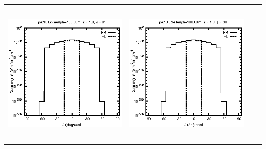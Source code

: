\documentclass[10pt,a4paper]{article}
\begin{document}
\begin{adjustwidth}{-1.2in}{-1.2in}
\begin{tabular}{c c c c}
\includegraphics[height=7cm]{../eps/jok10_Ld_sample_100.00m_fwd.eps} &
\includegraphics[height=7cm]{../eps/jok10_Ld_sample_100.00m_cross.eps} \\
\end{tabular}

\pagebreak


\end{adjustwidth}
\end{document}
